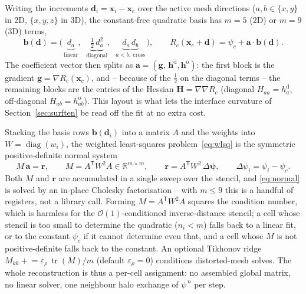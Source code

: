 \documentclass[preprint,3p,11pt]{elsarticle}
\newcommand{\psilev}{\psi}                       %
\newcommand{\xc}{\mathbf{x}_c}                    %
\begin{document}
Writing the increments $\mathbf{d}_i=\mathbf{x}_i-\xc$ over the active mesh directions
($a,b\in\{x,y\}$ in 2D, $\{x,y,z\}$ in 3D), the constant-free quadratic basis has
$m=5$ (2D) or $m=9$ (3D) terms,
\begin{equation}
  \mathbf{b}(\mathbf{d}) =
    \bigl(\, \underbrace{d_a}_{\text{linear}},\;\;
             \underbrace{\tfrac12\,d_a^{2}}_{\text{diagonal}},\;\;
             \underbrace{d_a\,d_b}_{a<b,\ \text{cross}} \,\bigr),
  \qquad
  R_c(\xc+\mathbf{d}) = \psilev_c + \mathbf{a}\cdot\mathbf{b}(\mathbf{d}).
  \label{eq:basis}
\end{equation}
The coefficient vector then splits as $\mathbf{a}=(\mathbf{g},\,\mathbf{h}^{\mathrm{d}},
\mathbf{h}^{\mathrm{o}})$: the first block is the gradient $\mathbf{g}=\nabla R_c(\xc)$,
and -- because of the $\tfrac12$ on the diagonal terms -- the remaining blocks are the
entries of the Hessian $\mathbf{H}=\nabla\nabla R_c$ (diagonal $H_{aa}=h^{\mathrm{d}}_a$,
off-diagonal $H_{ab}=h^{\mathrm{o}}_{ab}$). This layout is what lets the interface
curvature of Section~\ref{sec:surften} be read off the fit at no extra cost.

Stacking the basis rows $\mathbf{b}(\mathbf{d}_i)$ into a matrix $A$ and the weights
into $W=\operatorname{diag}(w_i)$, the weighted least-squares problem~\eqref{eq:wlsq}
is the symmetric positive-definite normal system
\begin{equation}
  M\,\mathbf{a} = \mathbf{r}, \qquad
  M = A^{\mathsf T} W^{2} A \in \mathbb{R}^{m\times m}, \qquad
  \mathbf{r} = A^{\mathsf T} W^{2}\,\Delta\bm{\psi},
  \qquad \Delta\psi_i = \psilev_i-\psilev_c .
  \label{eq:normal}
\end{equation}
Both $M$ and $\mathbf{r}$ are accumulated in a single sweep over the stencil, and
\eqref{eq:normal} is solved by an in-place Cholesky factorisation -- with $m\le 9$ this
is a handful of registers, not a library call. Forming $M=A^{\mathsf T}W^{2}A$ squares
the condition number, which is harmless for the $\mathcal{O}(1)$-conditioned
inverse-distance stencil; a cell whose stencil is too small to determine the quadratic
($n_i<m$) falls back to a linear fit, or to the constant $\psilev_c$ if it cannot
determine even that, and a cell whose $M$ is not positive-definite falls back to the
constant. An optional Tikhonov ridge
$M_{kk}\mathrel{+}=\varepsilon_{\rho}\,\operatorname{tr}(M)/m$ (default
$\varepsilon_{\rho}=0$) conditions distorted-mesh solves. The whole reconstruction is
thus a per-cell assignment: no assembled global matrix, no linear solver, one neighbour
halo exchange of $\psilev^{\,n}$ per step.
\end{document}
